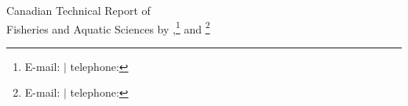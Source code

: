 \normalsize
{}
\thispagestyle{empty}
\noindent
\begin{center}
Canadian Technical Report of\\
Fisheries and Aquatic Sciences \trReportNum{}
\vfill
\trYear{}
\vfill
\MakeTextUppercase{\trTitle{}}
\vfill
by
\vfill
\trAuthALong{},\footnote{E-mail: \trAuthAEmail{} $|$ telephone: \trAuthAPhone{}} and \trAuthBLong{}\footnote{E-mail: \trAuthBEmail{} $|$ telephone: \trAuthBPhone{}}
\vfill
\trAddy{}
\end{center}
\clearpage
